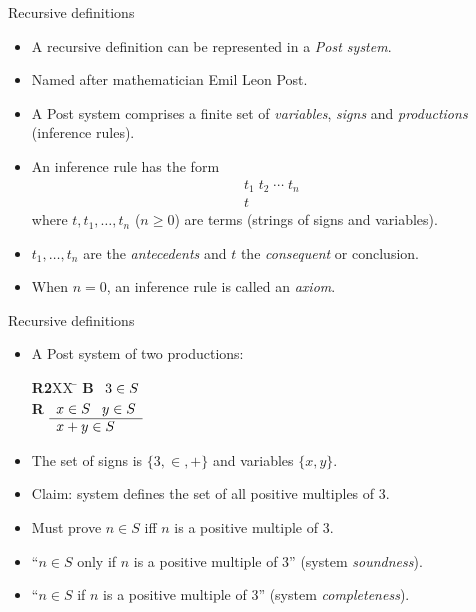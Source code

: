 \documentclass[style=sailor,size=12pt]{powerdot}
\begin{document}
\begin{wideslide}[bm=,toc=]{Recursive definitions}
\begin{itemize}
\item A recursive definition can be represented in a {\em Post system\/}.
\item Named after mathematician Emil Leon Post.
\item A Post system comprises a finite set of {\em variables\/}, {\em signs\/} and {\em productions\/} 
(inference rules).
\item An inference rule has the form
\begin{displaymath}
\begin{array}{c}
t_1\;t_2\;\cdots\;t_n\\
\hline
t
\end{array}
\end{displaymath}
where $t,t_1,\ldots ,t_n$ ($n\geq 0$) are terms (strings of signs and variables).
\item $t_1,\ldots , t_n$ are the {\em antecedents\/} and $t$ the {\em consequent\/} or conclusion.
\item When $n=0$, an inference rule is called an {\em axiom\/}.
\end{itemize}
\end{wideslide}

\begin{wideslide}[bm=,toc=]{Recursive definitions}
\begin{itemize}
\item A Post system of two productions:
\vspace{-1em}
\begin{tabbing}
{\bf R2}XX \=  \kill
{\bf B} \>
        \(\begin{array}[t]{l}
        3\in S
        \end{array}\) \\[2ex]
{\bf R} \>
        \(\begin{array}[t]{l}
        x \in S \;\;\;y \in S \\
        \hline
        x + y \in S
        \end{array}\)
\end{tabbing}
\item The set of signs is $\{3,\in,+\}$ and variables $\{x,y\}$.
\item Claim: system defines the set of all positive multiples of 3.
\item Must prove $n\in S$ iff $n$ is a positive multiple of 3.
\item ``$n\in S$ only if $n$ is a positive multiple of 3'' (system {\em soundness\/}).
\item ``$n\in S$ if $n$ is a positive multiple of 3'' (system {\em completeness\/}).
\end{itemize}
\end{wideslide}
\end{document}
